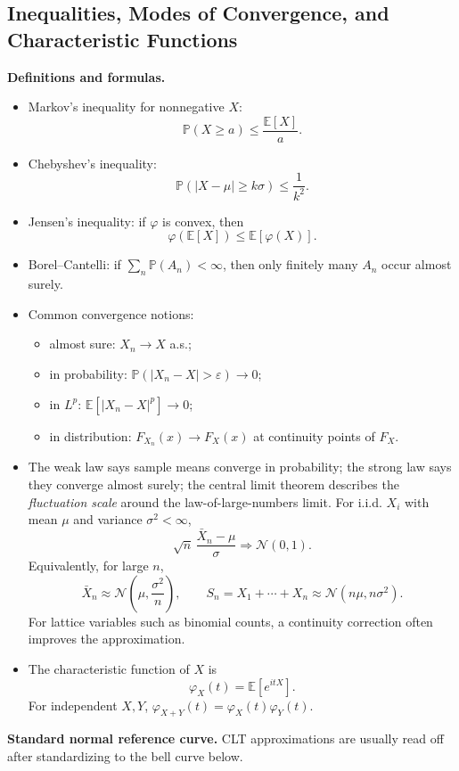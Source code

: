 \documentclass[11pt]{article}
\theoremstyle{definition}
\newcommand{\E}{\mathbb{E}}
\begin{document}
\subsection{Inequalities, Modes of Convergence, and Characteristic Functions}
\textbf{Definitions and formulas.}
\begin{itemize}
    \item Markov's inequality for nonnegative $X$:
    \[
        \mathbb{P}(X\ge a)\le \frac{\E[X]}{a}.
    \]
    \item Chebyshev's inequality:
    \[
        \mathbb{P}(|X-\mu|\ge k\sigma)\le \frac{1}{k^2}.
    \]
    \item Jensen's inequality: if $\varphi$ is convex, then
    \[
        \varphi(\E[X])\le \E[\varphi(X)].
    \]
    \item Borel--Cantelli: if $\sum_n \mathbb{P}(A_n)<\infty$, then only finitely many $A_n$ occur almost surely.
    \item Common convergence notions:
    \begin{itemize}
        \item almost sure: $X_n\to X$ a.s.;
        \item in probability: $\mathbb{P}(|X_n-X|>\varepsilon)\to 0$;
        \item in $L^p$: $\E[|X_n-X|^p]\to 0$;
        \item in distribution: $F_{X_n}(x)\to F_X(x)$ at continuity points of $F_X$.
    \end{itemize}
    \item The weak law says sample means converge in probability; the strong law says they converge almost surely; the central limit theorem describes the \emph{fluctuation scale} around the law-of-large-numbers limit. For i.i.d. $X_i$ with mean $\mu$ and variance $\sigma^2<\infty$,
    \[
        \sqrt{n}\,\frac{\bar X_n-\mu}{\sigma} \Rightarrow \mathcal{N}(0,1).
    \]
    Equivalently, for large $n$,
    \[
        \bar X_n \approx \mathcal{N}\!\left(\mu,\frac{\sigma^2}{n}\right),
        \qquad
        S_n=X_1+\cdots+X_n \approx \mathcal{N}(n\mu,n\sigma^2).
    \]
    For lattice variables such as binomial counts, a continuity correction often improves the approximation.
    \item The characteristic function of $X$ is
    \[
        \varphi_X(t)=\E[e^{itX}].
    \]
    For independent $X,Y$, $\varphi_{X+Y}(t)=\varphi_X(t)\varphi_Y(t)$.
\end{itemize}

\textbf{Standard normal reference curve.} CLT approximations are usually read off after standardizing to the bell curve below.
\end{document}
